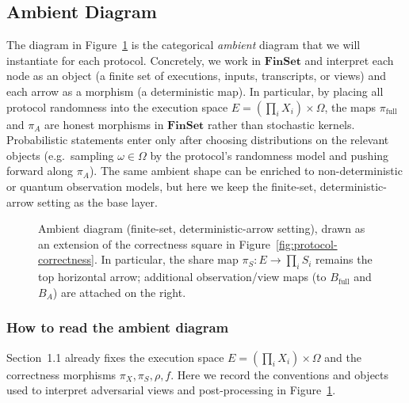 \documentclass[11pt,a4paper]{article}
\theoremstyle{definition}
\theoremstyle{plain}
\begin{document}
\subsection{Ambient Diagram}

The diagram in Figure~\ref{fig:master-diagram} is the categorical \emph{ambient} diagram that we will instantiate for each protocol. Concretely, we work in $\mathbf{FinSet}$ and interpret each node as an object (a finite set of executions, inputs, transcripts, or views) and each arrow as a morphism (a deterministic map). In particular, by placing all protocol randomness into the execution space $E=(\prod_i X_i)\times \Omega$, the maps $\pi_{\mathrm{full}}$ and $\pi_A$ are honest morphisms in $\mathbf{FinSet}$ rather than stochastic kernels. Probabilistic statements enter only after choosing distributions on the relevant objects (e.g.\ sampling $\omega\in\Omega$ by the protocol's randomness model and pushing forward along $\pi_A$). The same ambient shape can be enriched to non-deterministic or quantum observation models, but here we keep the finite-set, deterministic-arrow setting as the base layer.

\begin{figure}[ht]
\centering
{}
\caption{Ambient diagram (finite-set, deterministic-arrow setting), drawn as an extension of the correctness square in Figure~\ref{fig:protocol-correctness}. In particular, the share map $\pi_S:E\to \prod_i S_i$ remains the top horizontal arrow; additional observation/view maps (to $B_{\mathrm{full}}$ and $B_A$) are attached on the right.}
\label{fig:master-diagram}
\end{figure}

\subsubsection{How to read the ambient diagram}
\label{subsubsec:ambient-diagram-legend}
Section~1.1 already fixes the execution space $E=(\prod_i X_i)\times\Omega$ and the correctness morphisms $\pi_X,\pi_S,\rho,f$.
Here we record the conventions and objects used to interpret adversarial views and post-processing in Figure~\ref{fig:master-diagram}.
\end{document}
